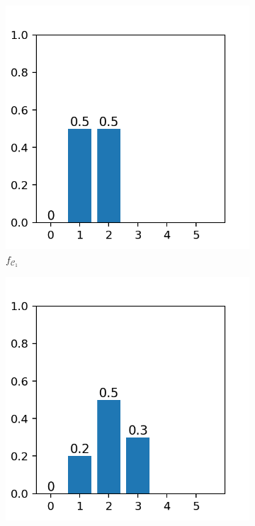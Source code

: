 \documentclass[a4paper,oneside]{csthesis}
\begin{document}
\begin{figure}[h]
\centering
    \begin{subfigure}[c]{0.3\textwidth}
        \includegraphics[width=\textwidth]{figures/ex_backlog.png}
        \caption{$f_{\mathcal{C}_1}$}\label{}
    \end{subfigure}
    \quad
    \begin{subfigure}[c]{0.3\textwidth}
        \includegraphics[width=\textwidth]{figures/ex_job_pmf.png}

\end{subfigure}
\end{figure}
\end{document}
